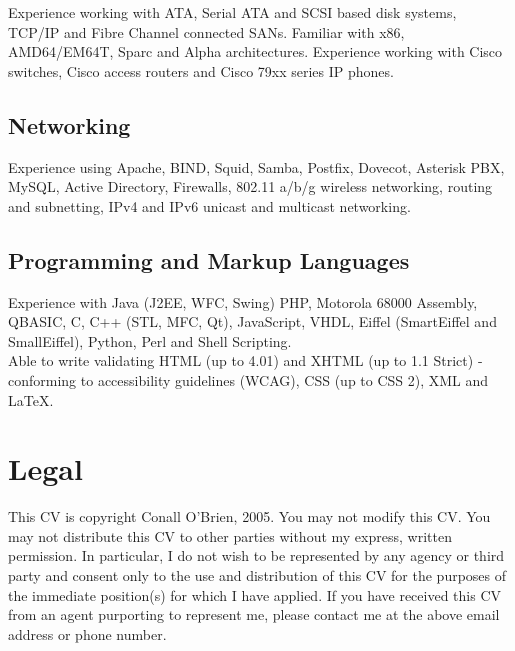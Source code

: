\documentclass[a4paper, 11pt] {article}
\begin{document}
Experience working with ATA, Serial ATA and SCSI based disk systems, TCP/IP and 
Fibre Channel connected SANs. Familiar with x86, AMD64/EM64T, Sparc and
Alpha architectures. Experience working with Cisco switches, Cisco 
access routers and Cisco 79xx series IP phones.

\subsection*{Networking}

Experience using Apache, BIND, Squid, Samba, Postfix, Dovecot,
Asterisk PBX, MySQL, Active  Directory, Firewalls, 802.11 a/b/g wireless 
networking, routing and subnetting, IPv4 and IPv6 unicast and multicast 
networking.
 

\subsection*{Programming and Markup Languages}

Experience with Java (J2EE, WFC, Swing) PHP, Motorola 68000 Assembly, QBASIC,
C, C++ (STL, MFC, Qt), JavaScript, VHDL, Eiffel (SmartEiffel and 
SmallEiffel), Python, Perl and Shell Scripting. \\

Able to write validating HTML (up to 4.01) and XHTML (up 
to 1.1 Strict) - conforming to accessibility guidelines (WCAG), CSS (up to 
CSS 2), XML and LaTeX.

\section*{Legal}

This CV is copyright Conall O'Brien, 2005. You may not modify this
CV. You may not distribute this CV to other parties without my express,
written permission. In particular, I do not wish to be represented by
any agency or third party and consent only to the use and distribution
of this CV for the purposes of the immediate position(s) for which I
have applied. If you have received this CV from an agent purporting to
represent me, please contact me at the above email address or phone
number.
\end{document}
